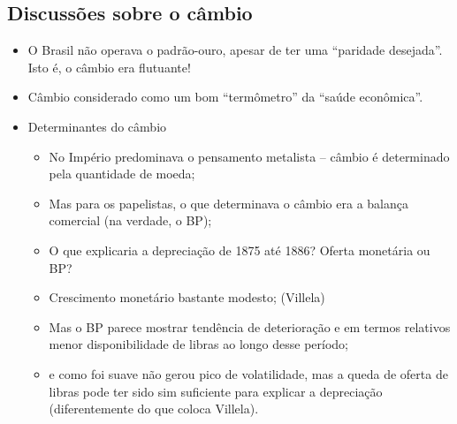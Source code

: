 \documentclass[a4paper,12pt]{article}[abntex2]
\begin{document}
\subsection{\textbf{Discussões sobre o câmbio}}
\begin{itemize}
    \item O Brasil não operava o padrão-ouro, apesar de ter uma “paridade desejada”. Isto é, o câmbio era flutuante!
    \item Câmbio considerado como um bom “termômetro” da “saúde econômica”.
    \item Determinantes do câmbio
    \begin{itemize}
        \item  No Império predominava o pensamento metalista – câmbio é determinado pela quantidade de moeda;
    \end{itemize}
    \begin{itemize}
        \item Mas para os papelistas, o que determinava o câmbio era a balança comercial (na verdade, o BP);
    \end{itemize}
    \begin{itemize}
        \item O que explicaria a depreciação de 1875 até 1886? Oferta monetária ou BP?
    \end{itemize}
    \begin{itemize}
        \item Crescimento monetário bastante modesto; (Villela)
    \end{itemize}
    \begin{itemize}
        \item Mas o BP parece mostrar tendência de deterioração e em termos relativos menor disponibilidade de libras ao longo desse período;
    \end{itemize}
    \begin{itemize}
        \item e como foi suave não gerou pico de volatilidade, mas a queda de oferta de libras pode ter sido sim suficiente para explicar a depreciação (diferentemente do que coloca Villela).
    \end{itemize}
\end{itemize}
\end{document}
